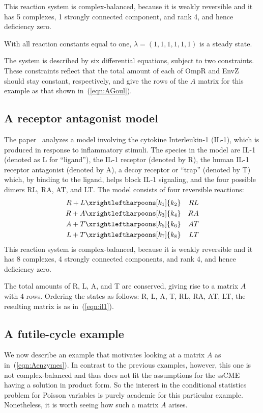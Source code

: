 \documentclass[11pt]{article}
\newcommand{\beqn}{\begin{eqnarray*}}
\newcommand{\eeqn}{\end{eqnarray*}}
\newcommand{\arrowschem}[2]{\xrightleftharpoons[#1]{#2}}
\begin{document}
This reaction system is complex-balanced, because it is weakly reversible and
it has 5 complexes, 1 strongly connected component, and rank 4, and hence
deficiency zero.

With all reaction constants equal to one, $\lambda =(1,1,1,1,1,1)$ is a steady state.

The system is described by six differential equations, subject to
two constraints.  These constraints reflect that the total amount of each of
OmpR and EnvZ should stay constant, respectively, and give the rows of the $A$
matrix for this example as that shown in~(\ref{eqn:AGoul}).

\subsection{A receptor antagonist model}

The paper~\cite{gnacadja07} analyzes a model involving the cytokine
Interleukin-1 (IL-1), which is produced in response to inflammatory stimuli.
The species in the model are IL-1 (denoted as L for ``ligand''), the IL-1
receptor (denoted by R), the human IL-1 receptor antagonist (denoted by A),
a decoy receptor or ``trap'' (denoted by T) which, by binding to the
ligand, helps block IL-1 signaling, and the four possible dimers RL, RA, AT,
and LT. 
The model consists of four reversible reactions:
\beqn
R+L &\arrowschem{k_1}{k_2}& RL\\
R+A &\arrowschem{k_3}{k_4}& RA\\
A+T &\arrowschem{k_5}{k_6}& AT\\
L+T &\arrowschem{k_7}{k_8}& LT
\eeqn
This reaction system is complex-balanced, because it is weakly reversible and
it has 8 complexes, 4 strongly connected components, and rank 4, and hence
deficiency zero.

The total amounts of R, L, A, and T are conserved, giving rise to a matrix $A$
with 4 rows.
Ordering the states as follows:
R, L, A, T, RL, RA, AT, LT,
the resulting matrix is as in~(\ref{eqn:il1}).


\subsection{A futile-cycle example}

We now describe an example that motivates looking at a matrix
$A$ as in~(\ref{eqn:Aenzymes}).  In contrast to the previous examples,
however, this one is not complex-balanced and thus does not fit the assumptions
for the ssCME having a solution in product form.  So the interest in the
conditional statistics problem for Poisson variables is purely academic
for this particular example.
Nonetheless, it is worth seeing how such a matrix $A$ arises.
\end{document}

